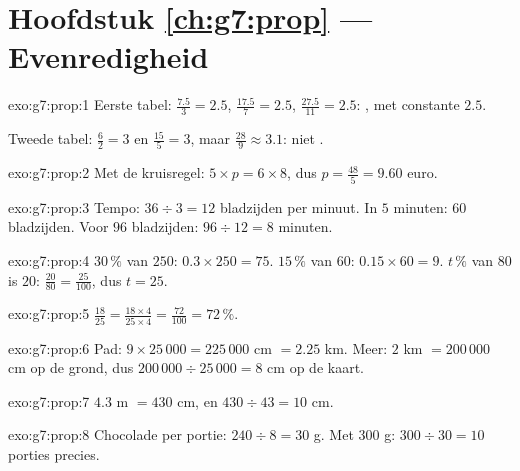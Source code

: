 \section*{Hoofdstuk \ref{ch:g7:prop} --- Evenredigheid}

\begin{solution}{exo:g7:prop:1}
Eerste tabel:  $\frac{7.5}{3} = 2.5$, $\frac{17.5}{7} = 2.5$,
$\frac{27.5}{11} = 2.5$: , met constante $2.5$.

Tweede tabel: $\frac62 = 3$ en $\frac{15}{5} = 3$, maar
$\frac{28}{9} \approx 3.1$: niet .
\end{solution}

\begin{solution}{exo:g7:prop:2}
Met de kruisregel: $5 \times p = 6 \times 8$, dus $p = \frac{48}{5} = 9.60$ euro.
\end{solution}

\begin{solution}{exo:g7:prop:3}
Tempo: $36 \div 3 = 12$ bladzijden per minuut. In $5$ minuten: $60$ bladzijden.
Voor $96$ bladzijden: $96 \div 12 = 8$ minuten.
\end{solution}

\begin{solution}{exo:g7:prop:4}
$30\,\%$ van $250$: $0.3 \times 250 = 75$. \quad
$15\,\%$ van $60$: $0.15 \times 60 = 9$. \quad
$t\,\%$ van $80$ is $20$: $\frac{20}{80} = \frac{25}{100}$, dus $t = 25$.
\end{solution}

\begin{solution}{exo:g7:prop:5}
$\frac{18}{25} = \frac{18 \times 4}{25 \times 4} = \frac{72}{100} = 72\,\%$.
\end{solution}

\begin{solution}{exo:g7:prop:6}
Pad: $9 \times 25\,000 = 225\,000$ cm $= 2.25$ km. Meer: $2$ km $= 200\,000$ cm op
de grond, dus $200\,000 \div 25\,000 = 8$ cm op de kaart.
\end{solution}

\begin{solution}{exo:g7:prop:7}
$4.3$ m $= 430$ cm, en $430 \div 43 = 10$ cm.
\end{solution}

\begin{solution}{exo:g7:prop:8}
Chocolade per portie: $240 \div 8 = 30$ g. Met $300$ g: $300 \div 30 = 10$ porties
precies.
\end{solution}

